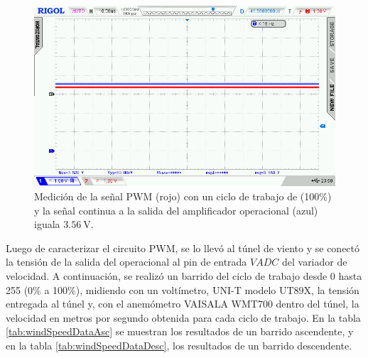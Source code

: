 \begin{figure}[H]
    \centering
    \includegraphics[width=0.9\linewidth]{Figuras/datalogger/Hardware/MedicionesPWM/255.png}
    \caption{Medición de la señal PWM (rojo) con un ciclo de trabajo de (100\%) y la señal continua a la salida del amplificador operacional (azul) iguala $\SI{3.56}{\volt}$.}
    \label{fig:255}
\end{figure}
Luego de caracterizar el circuito PWM, se lo llevó al túnel de viento y se conectó la tensión de la salida del operacional al pin de entrada $VADC$ del variador de velocidad. A continuación, se realizó un barrido del ciclo de trabajo desde 0 hasta 255 (0\% a 100\%), midiendo con un voltímetro, UNI-T modelo UT89X, la tensión entregada al túnel y, con el anemómetro VAISALA WMT700 dentro del túnel, la velocidad en metros por segundo obtenida para cada ciclo de trabajo. En la tabla \ref{tab:windSpeedDataAsc} se muestran los resultados de un barrido ascendente, y en la tabla \ref{tab:windSpeedDataDesc}, los resultados de un barrido descendente.

